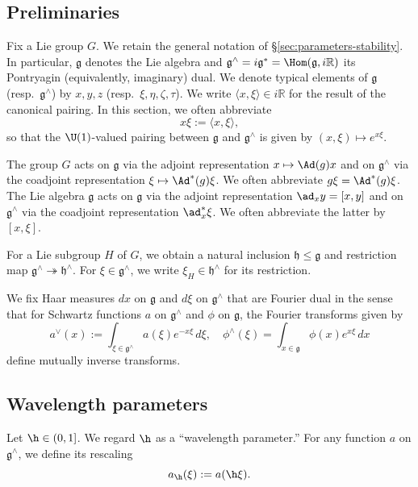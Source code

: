 \subsection{Preliminaries}
Fix a Lie group $G$.  We retain the general notation of \S\ref{sec:parameters-stability}.  In particular, $\mathfrak{g}$ denotes the Lie algebra and $\mathfrak{g}^\wedge = i \mathfrak{g}^* = \Hom(\mathfrak{g},i \mathbb{R})$ its Pontryagin (equivalently, imaginary) dual.  We denote typical elements of $\mathfrak{g}$ (resp.\ $\mathfrak{g}^\wedge$) by $x,y,z$ (resp.\ $\xi,\eta,\zeta,\tau$).  We write $\langle x, \xi \rangle \in i \mathbb{R}$ for the result of the canonical pairing.  In this section, we often abbreviate
\begin{equation*}
  x \xi := \langle x, \xi \rangle,
\end{equation*}
so that the $\U(1)$-valued pairing between $\mathfrak{g}$ and $\mathfrak{g}^\wedge$ is given by $(x,\xi) \mapsto e^{ x \xi}$.

The group $G$ acts on $\mathfrak{g}$ via the adjoint representation $x \mapsto \Ad(g) x$ and on $\mathfrak{g}^\wedge$ via the coadjoint representation $\xi \mapsto \Ad^*(g) \xi$.  We often abbreviate $g \xi = \Ad^*(g) \xi$.  The Lie algebra $\mathfrak{g}$ acts on $\mathfrak{g}$ via the adjoint representation $\ad_x y = [x,y]$ and on $\mathfrak{g}^\wedge$ via the coadjoint representation $\ad_x^* \xi$.  We often abbreviate the latter by $[x,\xi]$.

For a Lie subgroup $H$ of $G$, we obtain a natural inclusion $\mathfrak{h} \leq \mathfrak{g}$ and restriction map $\mathfrak{g}^\wedge \twoheadrightarrow \mathfrak{h}^\wedge$.  For $\xi \in \mathfrak{g}^\wedge$, we write $\xi_H \in \mathfrak{h}^\wedge$ for its restriction.

We fix Haar measures $d x$ on $\mathfrak{g}$ and $d \xi$ on $\mathfrak{g}^\wedge$ that are Fourier dual in the sense that for Schwartz functions $a$ on $\mathfrak{g}^\wedge$ and $\phi$ on $\mathfrak{g}$, the Fourier transforms given by 
\begin{equation*}
  a^\vee(x) := \int_{\xi \in \mathfrak{g} ^\wedge }
  a(\xi) e^{- x \xi} \, d \xi,
  \quad
  \phi^\wedge(\xi)
  = \int_{x \in \mathfrak{g} }
  \phi(x)
  e^{x \xi} \, d x
\end{equation*}
define mutually inverse transforms.


\subsection{Wavelength parameters}
Let $\h \in (0,1]$.  We regard  $\h$ as a ``wavelength parameter.''  For any function $a$ on $\mathfrak{g}^\wedge$, we define its rescaling 
\begin{equation*}
  a_{\h}(\xi) := a(\h \xi).
\end{equation*}


